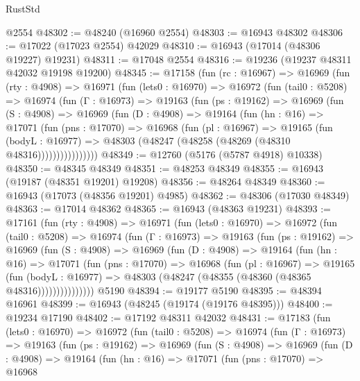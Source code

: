 \begin{lexlean}{RustStd}
\begin{coremodule}
    @2554
@48302 := @48240 (@16960 @2554)
@48303 := @16943 @48302
@48306 := @17022 (@17023 @2554) @42029
@48310 := @16943 (@17014 (@48306 @19227) @19231)
@48311 := @17048 @2554
@48316 := @19236 (@19237 @48311 @42032 @19198 @19200)
@48345 := @17158
    (fun (rc : @16967) =>
    @16969
      (fun (rty : @4908) =>
      @16971
        (fun (lets0 : @16970) =>
        @16972
          (fun (tail0 : @5208) =>
          @16974
            (fun (Γ : @16973) =>
            @19163
              (fun (ps : @19162) =>
              @16969
                (fun (S : @4908) =>
                @16969
                  (fun (D : @4908) =>
                  @19164
                    (fun (hn : @16) =>
                    @17071
                      (fun (pns : @17070) =>
                      @16968
                        (fun (pl : @16967) =>
                        @19165
                          (fun (bodyL : @16977) =>
                          @48303 (@48247 (@48258 (@48269 (@48310 @48316))))))))))))))))
@48349 := @12760 (@5176 (@5787 @4918) @10338)
@48350 := @48345 @48349
@48351 := @48253 @48349
@48355 := @16943 (@19187 (@48351 @19201) @19208)
@48356 := @48264 @48349
@48360 := @16943 (@17073 (@48356 @19201) @4985)
@48362 := @48306 (@17030 @48349)
@48363 := @17014 @48362
@48365 := @16943 (@48363 @19231)
@48393 := @17161
    (fun (rty : @4908) =>
    @16971
      (fun (lets0 : @16970) =>
      @16972
        (fun (tail0 : @5208) =>
        @16974
          (fun (Γ : @16973) =>
          @19163
            (fun (ps : @19162) =>
            @16969
              (fun (S : @4908) =>
              @16969
                (fun (D : @4908) =>
                @19164
                  (fun (hn : @16) =>
                  @17071
                    (fun (pns : @17070) =>
                    @16968
                      (fun (pl : @16967) =>
                      @19165
                        (fun (bodyL : @16977) =>
                        @48303 (@48247 (@48355 (@48360 (@48365 @48316)))))))))))))))
    @5190
@48394 := @19177 @5190
@48395 := @48394 @16961
@48399 := @16943 (@48245 (@19174 (@19176 @48395)))
@48400 := @19234 @17190
@48402 := @17192 @48311 @42032
@48431 := @17183
    (fun (lets0 : @16970) =>
    @16972
      (fun (tail0 : @5208) =>
      @16974
        (fun (Γ : @16973) =>
        @19163
          (fun (ps : @19162) =>
          @16969
            (fun (S : @4908) =>
            @16969
              (fun (D : @4908) =>
              @19164
                (fun (hn : @16) =>
                @17071
                  (fun (pns : @17070) =>
                  @16968

\end{coremodule}
\end{lexlean}
